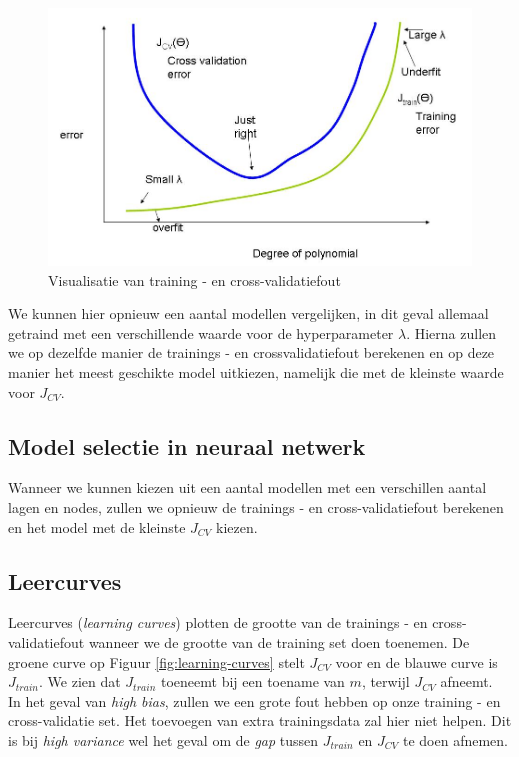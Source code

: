 \begin{figure}[h]
	\centering
	\includegraphics[width=0.65\linewidth]{images/19-error-plot-lambda.png}
	\caption{Visualisatie van training - en cross-validatiefout}
	\label{fig:error-plot-lambda}
\end{figure}
\noindent
We kunnen hier opnieuw een aantal modellen vergelijken, in dit geval allemaal getraind met een verschillende waarde voor de hyperparameter $\lambda$. Hierna zullen we op dezelfde manier de trainings - en crossvalidatiefout berekenen en op deze manier het meest geschikte model uitkiezen, namelijk die met de kleinste waarde voor $J_{CV}$. 

\subsection{Model selectie in neuraal netwerk}

Wanneer we kunnen kiezen uit een aantal  modellen met een verschillen aantal lagen en nodes, zullen we opnieuw de trainings - en cross-validatiefout berekenen en het model met de kleinste $J_{CV}$ kiezen. 

\subsection{Leercurves}

Leercurves (\textit{learning curves}) plotten de grootte van de trainings - en cross-validatiefout wanneer we de grootte van de training set doen toenemen. De groene curve op Figuur \ref{fig:learning-curves} stelt $J_{CV}$ voor en de blauwe curve is $J_{train}$. We zien dat $J_{train}$ toeneemt bij een toename van $m$, terwijl $J_{CV}$ afneemt. \\
\newline
In het geval van \textit{high bias}, zullen we een grote fout hebben op onze training - en cross-validatie set. Het toevoegen van extra trainingsdata zal hier niet helpen. Dit is bij \textit{high variance} wel het geval om de \textit{gap} tussen $J_{train}$ en $J_{CV}$ te doen afnemen.

